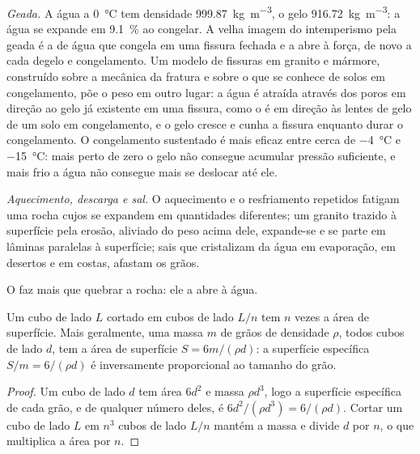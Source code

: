 \emph{Geada.} A água a \qty{0}{\celsius} tem densidade \qty{999.87}{kg.m^{-3}}, o gelo \qty{916.72}{kg.m^{-3}}: a água se expande em \qty{9.1}{\percent} ao congelar. A velha imagem do intemperismo pela geada é a de água que congela em uma fissura fechada e a abre à força, de novo a cada degelo e congelamento. Um modelo de fissuras em granito e mármore, construído sobre a mecânica da fratura e sobre o que se conhece de solos em congelamento, põe o peso em outro lugar: a água é atraída através dos poros em direção ao gelo já existente em uma fissura, como o é em direção às lentes de gelo de um solo em congelamento, e o gelo cresce e cunha a fissura enquanto durar o congelamento. O congelamento sustentado é mais eficaz entre cerca de \qty{-4}{\celsius} e \qty{-15}{\celsius}: mais perto de zero o gelo não consegue acumular pressão suficiente, e mais frio a água não consegue mais se deslocar até ele.

\emph{Aquecimento, descarga e sal.} O aquecimento e o resfriamento repetidos fatigam uma rocha cujos  se expandem em quantidades diferentes; um granito trazido à superfície pela erosão, aliviado do peso acima dele, expande-se e se parte em lâminas paralelas à superfície; sais que cristalizam da água em evaporação, em desertos e em costas, afastam os grãos.

O  faz mais que quebrar a rocha: ele a abre à água.

\begin{proposition}\label{prop:b1:weathering-clays:surface}
Um cubo de lado $L$ cortado em cubos de lado $L/n$ tem $n$ vezes a área de superfície. Mais geralmente, uma massa $m$ de grãos de densidade $\rho$, todos cubos de lado $d$, tem a área de superfície $S = 6m/(\rho d)$: a superfície específica $S/m =
6/(\rho d)$ é inversamente proporcional ao tamanho do grão.
\end{proposition}

\begin{proof}
Um cubo de lado $d$ tem área $6d^2$ e massa $\rho d^3$, logo a superfície específica de cada grão, e de qualquer número deles, é $6d^2/(\rho d^3)
= 6/(\rho d)$. Cortar um cubo de lado $L$ em $n^3$ cubos de lado $L/n$ mantém a massa e divide $d$ por $n$, o que multiplica a área por $n$.
\end{proof}

